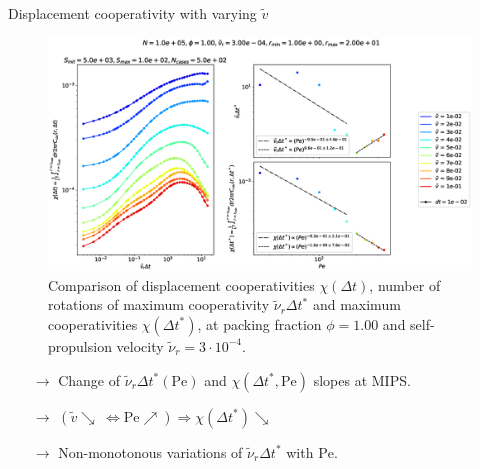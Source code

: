 \documentclass{beamer}
\begin{document}
\begin{frame}{Displacement cooperativity with varying $\tilde{v}$}

\vspace{-0.2cm}
\begin{figure}[h!]
  \centering
  \includegraphics[width=0.8\linewidth]{intCuu_Dk8000_Rh3000_Nq1000_Io5000_Mn1000_Cn5000_RMINl1000_RMAXm2000.eps}
  \vspace{-0.2cm}
  \caption{Comparison of displacement cooperativities $\chi(\Delta t)$, number of rotations of maximum cooperativity $\tilde{\nu}_r\Delta t^*$ and maximum cooperativities $\chi(\Delta t^*)$, at packing fraction $\phi=1.00$ and self-propulsion velocity $\tilde{\nu}_r=3\cdot10^{-4}$.}
\end{figure}

\vspace{-0.3cm}
\begin{itemize}
  \item[$\rightarrow$] Change of $\tilde{\nu}_r \Delta t^*(\text{Pe})$ and $\chi(\Delta t^*, \text{Pe})$ slopes at MIPS.
  \item[$\rightarrow$] $(\tilde{v} \searrow~ \Leftrightarrow \text{Pe} \nearrow) \Rightarrow \chi(\Delta t^*)\searrow$
  \item[$\rightarrow$] Non-monotonous variations of $\tilde{\nu}_r\Delta t^*$ with $\text{Pe}$.
\end{itemize}

\end{frame}
\end{document}
